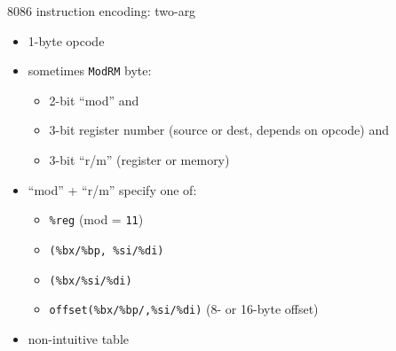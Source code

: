 \begin{frame}{8086 instruction encoding: two-arg}
\begin{itemize}
    \item 1-byte opcode
    \item sometimes {\tt ModRM} byte:
        \begin{itemize}
        \item 2-bit ``mod'' and 
        \item 3-bit register number (source or dest, depends on opcode) and
        \item 3-bit ``r/m'' (register or memory)
        \end{itemize}
    \item ``mod'' + ``r/m'' specify one of:
        \begin{itemize}
        \item {\tt \%reg} (mod = {\tt 11})
        \item {\tt (\%bx/\%bp, \%si/\%di)}
        \item {\tt (\%bx/\%si/\%di)}
        \item {\tt offset(\%bx/\%bp/,\%si/\%di)} (8- or 16-byte offset)
        \end{itemize}
    \item non-intuitive table
\end{itemize}
\end{frame}

